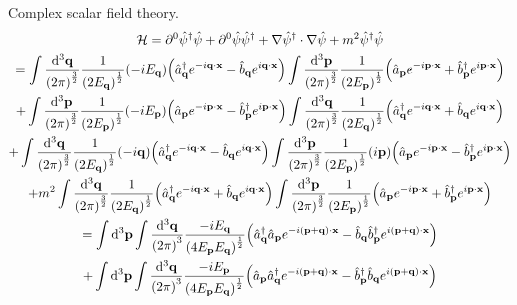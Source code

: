 \documentclass{report}
\begin{document}
\begin{subquests}
	\item Complex scalar field theory.
	\begin{gather*}
		\mathcal H = \partial^0\hat{\psi}^{\dagger}\hat{\psi} + \partial^0\hat{\psi}\hat{\psi}^{\dagger} + \nabla\hat{\psi}^{\dagger}\cdot\nabla\hat{\psi} + m^2 \hat{\psi}^{\dagger}\hat{\psi} \\
		= \int\frac{\dd^3{\vb q}}{\pqty{2\pi}^{\frac{3}{2}}}\frac{1}{\pqty{2E_{\vb q}}^{\frac{1}{2}}}\pqty{-iE_{\vb q}}\pqty{\hat{a}^{\dagger}_{\vb q}e^{-i\vb q\cdot \vb x} - \hat{b}_{\vb q}e^{i\vb q\cdot \vb x}}\int \frac{\dd^3{\vb p}}{\pqty{2\pi}^{\frac{3}{2}}}\frac{1}{\pqty{2E_{\vb p}}^{\frac{1}{2}}}\pqty{\hat{a}_{\vb p}e^{-i\vb p\cdot \vb x} + \hat{b}^{\dagger}_{\vb p}e^{i\vb p\cdot \vb x}} \\
		+ \int\frac{\dd^3{\vb p}}{\pqty{2\pi}^{\frac{3}{2}}}\frac{1}{\pqty{2E_{\vb p}}^{\frac{1}{2}}}\pqty{-iE_{\vb p}}\pqty{\hat{a}_{\vb p}e^{-i\vb p\cdot \vb x} - \hat{b}^{\dagger}_{\vb p}e^{i\vb p\cdot \vb x}}\int\frac{\dd^3{\vb q}}{\pqty{2\pi}^{\frac{3}{2}}}\frac{1}{\pqty{2E_{\vb q}}^{\frac{1}{2}}}\pqty{\hat{a}^{\dagger}_{\vb q}e^{-i\vb q\cdot \vb x} + \hat{b}_{\vb q}e^{i\vb q\cdot \vb x}}  \\
		+ \int\frac{\dd^3{\vb q}}{\pqty{2\pi}^{\frac{3}{2}}}\frac{1}{\pqty{2E_{\vb q}}^{\frac{1}{2}}}\pqty{-i\vb q}\pqty{\hat{a}^{\dagger}_{\vb q}e^{-i\vb q\cdot \vb x} - \hat{b}_{\vb q}e^{i\vb q\cdot \vb x}} \int\frac{\dd^3{\vb p}}{\pqty{2\pi}^{\frac{3}{2}}}\frac{1}{\pqty{2E_{\vb p}}^{\frac{1}{2}}}\pqty{i\vb p}\pqty{\hat{a}_{\vb p}e^{-i\vb p\cdot \vb x} - \hat{b}^{\dagger}_{\vb p}e^{i\vb p\cdot \vb x}}\\
		+ m^2 \int\frac{\dd^3{\vb q}}{\pqty{2\pi}^{\frac{3}{2}}}\frac{1}{\pqty{2E_{\vb q}}^{\frac{1}{2}}}\pqty{\hat{a}^{\dagger}_{\vb q}e^{-i\vb q\cdot \vb x} + \hat{b}_{\vb q}e^{i\vb q\cdot \vb x}}\int\frac{\dd^3{\vb p}}{\pqty{2\pi}^{\frac{3}{2}}}\frac{1}{\pqty{2E_{\vb p}}^{\frac{1}{2}}}\pqty{\hat{a}_{\vb p}e^{-i\vb p\cdot \vb x} + \hat{b}^{\dagger}_{\vb p}e^{i\vb p\cdot \vb x}} \\
		= \int\dd^3{\vb p}\int\frac{\dd^3{\vb q}}{\pqty{2\pi}^3}\frac{-iE_{\vb q}}{\pqty{4E_{\vb p}E_{\vb q}}^{\frac{1}{2}}}\pqty{\hat{a}^{\dagger}_{\vb q}\hat{a}_{\vb p}e^{-i(\vb p+\vb q)\cdot \vb x} - \hat{b}_{\vb q}\hat{b}^{\dagger}_{\vb p}e^{i(\vb p+\vb q)\cdot \vb x}} \\
		+ \int\dd^3{\vb p}\int\frac{\dd^3{\vb q}}{\pqty{2\pi}^3}\frac{-iE_{\vb p}}{\pqty{4E_{\vb p}E_{\vb q}}^{\frac{1}{2}}}\pqty{\hat{a}_{\vb p}\hat{a}^{\dagger}_{\vb q}e^{-i(\vb p+\vb q)\cdot \vb x} - \hat{b}^{\dagger}_{\vb p}\hat{b}_{\vb q}e^{i(\vb p+\vb q)\cdot \vb x}} \\

\end{gather*}
\end{subquests}
\end{document}
